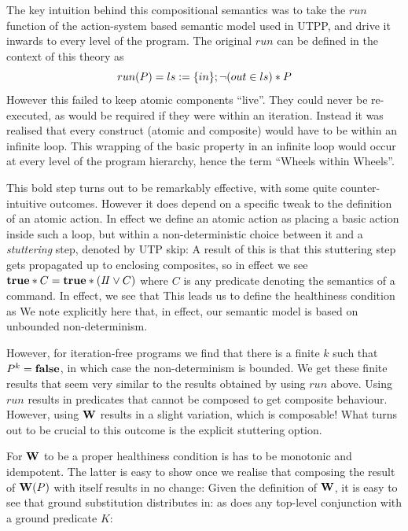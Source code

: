 The key intuition behind this compositional semantics was to take the
$run$ function of the action-system based semantic model used in UTPP,
and drive it inwards to every level of the program.
The original $run$ can be defined in the context of this theory as
\[
  run(P) = ls := \{in\} ; \lnot (out \in ls) * P
\]
However this failed to keep atomic components ``live''.
They could never be re-executed,
as would be required if they were within an iteration.
Instead it was realised that every construct (atomic and composite)
would have to be within an infinite loop.%
%
This wrapping of the basic property in an infinite loop
would occur at every level of the program hierarchy,
hence the term ``Wheels within Wheels''.

This bold step turns out to be remarkably effective,
with some quite counter-intuitive outcomes.
However it does depend on a specific tweak to the
definition of an atomic action.
In effect we define an atomic action
as placing a basic action inside such a loop,
but within a non-deterministic choice between it
and a \emph{stuttering} step, denoted by UTP skip:
A result of this is that this stuttering step gets
propagated up to enclosing composites,
so in effect we see $\mathbf{true} * C = \mathbf{true} * (I\!I\lor C)$
where $C$ is any predicate denoting the semantics of a command.
In effect,
we  see that
This leads us to define the healthiness condition as
%
We note explicitly here that, in effect,
our semantic model is based on unbounded non-determinism.

However, for iteration-free programs
we find that there is a finite $k$ such that $P^k = \mathbf{false}$,
in which case the non-determinism is bounded.
We get these finite results that seem very similar
to the results obtained by using $run$ above.
Using $run$ results in predicates that cannot be composed
to get composite behaviour.
However, using $\mathbf{W}$ results in a slight variation,
which is composable!
What turns out to be crucial
to this outcome is the explicit stuttering option.

For $\mathbf{W}$ to be a proper healthiness condition
is has to be monotonic and idempotent.
The latter is easy to show once we realise that composing the result
of $\mathbf{W}(P)$ with itself results in no change:
Given the definition of $\mathbf{W}$, it is easy to see that ground
substitution distributes in:
as does any top-level conjunction with a ground predicate $K$:




